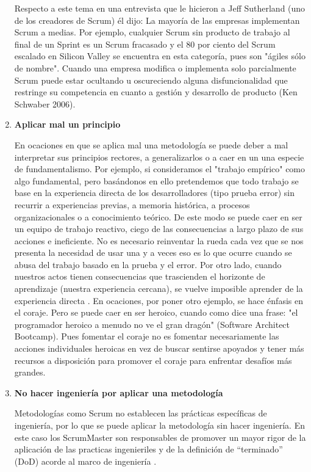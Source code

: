 \begin{enumerate}
Respecto a este tema en una entrevista que le hicieron a Jeff Sutherland (uno de los creadores de Scrum) él dijo: La mayoría de las empresas implementan Scrum a medias. Por ejemplo, cualquier Scrum sin producto de trabajo al final de un Sprint es un Scrum fracasado y el 80 por ciento del Scrum escalado en Silicon Valley se encuentra en esta categoría, pues son "ágiles sólo de nombre". Cuando una empresa modifica o implementa solo parcialmente Scrum puede estar ocultando u oscureciendo alguna disfuncionalidad que restringe su competencia en cuanto a gestión y desarrollo de producto (Ken Schwaber 2006).


\item \textbf{Aplicar mal un principio}

En ocaciones en que se aplica mal una metodología se puede deber a mal interpretar sus principios rectores, a generalizarlos o a caer en un una especie de fundamentalismo. Por ejemplo, si consideramos el "trabajo empírico" como algo fundamental, pero basándonos en ello pretendemos que todo trabajo se base en la experiencia directa de los desarrolladores (tipo prueba error) sin recurrir a experiencias previas, a memoria histórica, a procesos organizacionales o a conocimiento teórico. De este modo se puede caer en ser un equipo de trabajo reactivo, ciego de las consecuencias a largo plazo de sus acciones e ineficiente. No es necesario reinventar la rueda cada vez que se nos presenta la necesidad de usar una y a veces eso es lo que ocurre cuando se abusa del trabajo basado en la prueba y el error. Por otro lado, cuando nuestros actos tienen consecuencias que trascienden el horizonte de aprendizaje (nuestra experiencia cercana), se vuelve imposible aprender de la experiencia directa \cite{Peter-Senge-1990}. 
En ocaciones, por poner otro ejemplo, se hace énfasis en el coraje. Pero se puede caer en ser heroico, cuando como dice una frase: "el programador heroico a menudo no ve el gran dragón" (Software Architect Bootcamp). Pues fomentar el coraje no es fomentar necesariamente las acciones individuales heroicas en vez de buscar sentirse apoyados y tener más recursos a disposición para promover el coraje para enfrentar desafíos más grandes.

\item \textbf{No hacer ingeniería por aplicar una metodología}

Metodologías como Scrum  no establecen las prácticas específicas de ingeniería, por lo que se puede aplicar la metodología sin hacer ingeniería. En este caso los ScrumMaster son responsables de promover un mayor rigor de la aplicación de las practicas ingenieriles y de la definición de “terminado” (DoD) acorde al marco de ingeniería \cite{Gantthead-James-2010}.


\end{enumerate}
